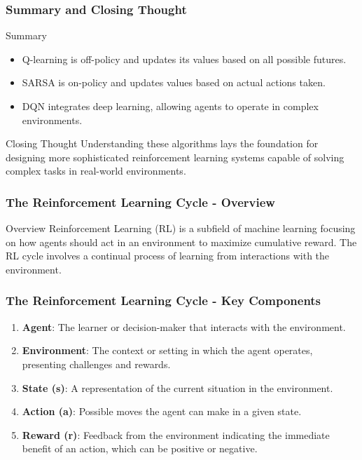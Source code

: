 \documentclass[aspectratio=169]{beamer}
\begin{document}
\begin{frame}[fragile]
    \frametitle{Summary and Closing Thought}
    
    \begin{block}{Summary}
        \begin{itemize}
            \item Q-learning is off-policy and updates its values based on all possible futures.
            \item SARSA is on-policy and updates values based on actual actions taken.
            \item DQN integrates deep learning, allowing agents to operate in complex environments.
        \end{itemize}
    \end{block}
    
    \begin{block}{Closing Thought}
        Understanding these algorithms lays the foundation for designing more sophisticated reinforcement learning systems capable of solving complex tasks in real-world environments.
    \end{block}
\end{frame}

\begin{frame}[fragile]
    \frametitle{The Reinforcement Learning Cycle - Overview}
    \begin{block}{Overview}
        Reinforcement Learning (RL) is a subfield of machine learning focusing on how agents should act in an environment to maximize cumulative reward. The RL cycle involves a continual process of learning from interactions with the environment.
    \end{block}
\end{frame}

\begin{frame}[fragile]
    \frametitle{The Reinforcement Learning Cycle - Key Components}
    \begin{enumerate}
        \item \textbf{Agent}: The learner or decision-maker that interacts with the environment.
        \item \textbf{Environment}: The context or setting in which the agent operates, presenting challenges and rewards.
        \item \textbf{State (s)}: A representation of the current situation in the environment.
        \item \textbf{Action (a)}: Possible moves the agent can make in a given state.
        \item \textbf{Reward (r)}: Feedback from the environment indicating the immediate benefit of an action, which can be positive or negative.
    \end{enumerate}
\end{frame}
\end{document}
